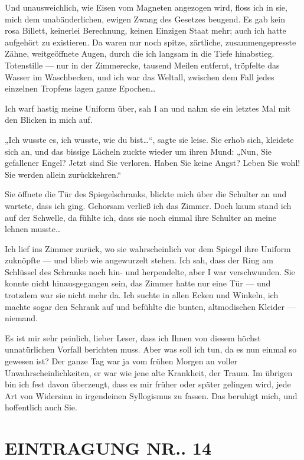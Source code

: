 Und unausweichlich, wie Eisen vom Magneten angezogen wird, floss
ich in sie, mich dem unabänderlichen, ewigen Zwang des Gesetzes
beugend. Es gab kein rosa Billett, keinerlei Berechnung, keinen
Einzigen Staat mehr; auch ich hatte aufgehört zu existieren. Da
waren nur noch spitze, zärtliche, zusammengepresste Zähne,
weitgeöffnete Augen, durch die ich langsam in die Tiefe hinabstieg.
Totenstille — nur in der Zimmerecke, tausend Meilen entfernt,
tröpfelte das Wasser im Waschbecken, und ich war
das Weltall, zwischen dem Fall jedes einzelnen Tropfens lagen ganze
Epochen\ldots{}

Ich warf hastig meine Uniform über, sah I an und nahm sie ein
letztes Mal mit den Blicken in mich auf.

„Ich wusste es, ich
wusste, wie du bist\ldots{}“, sagte sie leise. Sie erhob sich, kleidete
sich an, und das bissige Lächeln zuckte wieder um ihren Mund:
%
„Nun, Sie gefallener Engel? Jetzt sind Sie verloren. Haben Sie
keine Angst? Leben Sie wohl! Sie werden allein zurückkehren.“

Sie öffnete die Tür des Spiegelschranks, blickte mich über die
Schulter an und wartete, dass ich ging. Gehorsam verließ ich das
Zimmer. Doch kaum stand ich auf der Schwelle, da fühlte ich, dass
sie noch einmal ihre Schulter an meine lehnen musste\ldots{}

Ich lief ins Zimmer zurück, wo sie wahrscheinlich vor dem Spiegel
ihre Uniform zuknöpfte — und blieb wie angewurzelt stehen. Ich sah,
dass der Ring am Schlüssel des Schranks noch hin- und herpendelte,
aber I war verschwunden. Sie konnte nicht hinausgegangen sein, das
Zimmer hatte nur eine Tür — und trotzdem war sie nicht mehr da. Ich
suchte in allen Ecken und Winkeln, ich machte sogar den Schrank auf
und befühlte die bunten, altmodischen Kleider — niemand.

Es ist mir sehr peinlich, lieber Leser, dass ich Ihnen von diesem
höchst unnatürlichen Vorfall berichten muss. Aber was soll ich tun,
da es nun einmal so gewesen ist? Der ganze Tag war ja vom frühen
Morgen an voller Unwahrscheinlichkeiten, er war wie jene alte
Krankheit, der Traum. Im übrigen bin ich fest davon überzeugt, dass
es mir früher oder später gelingen wird, jede Art von Widersinn in
irgendeinen Syllogismus zu fassen. Das beruhigt mich, und
hoffentlich auch Sie.

\section{EINTRAGUNG NR.. 14}

